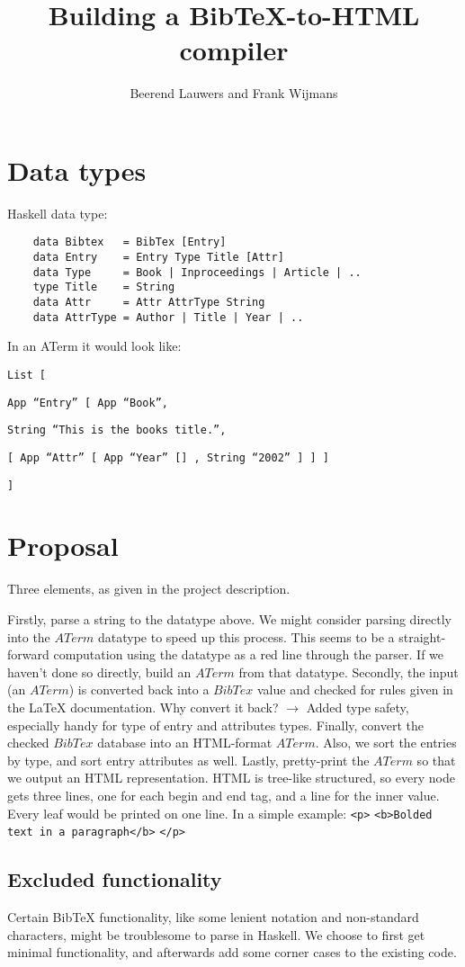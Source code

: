 \documentclass[10pt,a4paper]{article}
\author{Beerend Lauwers and Frank Wijmans}
\title{Building a BibTeX-to-HTML compiler}
\begin{document}
\section{Data types}	
	Haskell data type:

   	 \begin{lstlisting}
    data Bibtex   = BibTex [Entry]
    data Entry    = Entry Type Title [Attr]
    data Type     = Book | Inproceedings | Article | ..
    type Title    = String
    data Attr     = Attr AttrType String
    data AttrType = Author | Title | Year | ..	
    \end{lstlisting}
	
	In an ATerm it would look like:
	
	\texttt{List [} 
	
	\texttt{App ``Entry'' [ App ``Book'', }
		
	\texttt{String ``This is the books title.'', }
		
	\texttt{[ App ``Attr'' [ App ``Year'' [] , String ``2002''  ] ] ] }
	
	\texttt{]}
	
	
	\section{Proposal}
	
	Three elements, as given in the project description.
    
Firstly, parse a string to the datatype above. We might consider parsing directly into the $ ATerm $ datatype to speed up this process.
	This seems to be a straight-forward computation using the datatype as a red line through the parser.
    If we haven't done so directly, build an $ ATerm $ from that datatype.
\newline\newline
Secondly, the input (an $ ATerm $) is converted back into a $ BibTex $ value and checked for rules given in the LaTeX documentation. 
	Why convert it back? $ \rightarrow $ Added type safety, especially handy for type of entry and attributes types.
	Finally, convert the checked $ BibTex $ database into an HTML-format $ ATerm $. Also, we sort the entries by type, and sort entry attributes as well.
\newline\newline
Lastly, pretty-print the $ ATerm $ so that we output an  HTML representation.
	HTML is tree-like structured, so every node gets three lines, one for each begin and end tag, and a line for the inner value.
	Every leaf would be printed on one line.
	In a simple example:
\newline\newline
	\texttt{<p>}\newline
	\texttt{<b>Bolded text in a paragraph</b>}\newline
	\texttt{</p>}\newline

	\subsection{Excluded functionality}
	Certain BibTeX functionality, like some lenient notation and non-standard characters, might be troublesome to parse in Haskell. We choose to first get minimal functionality, and afterwards add some corner cases to the existing code.
	
	
	
\end{document}
